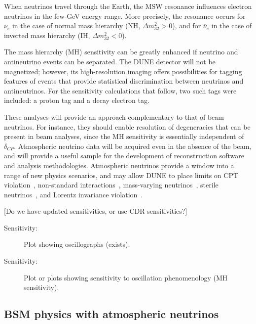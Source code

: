 When neutrinos travel through the Earth, the MSW resonance influences 
electron neutrinos in the few-GeV energy range. More precisely, the resonance 
occurs for $\nu_e$ in the case of normal mass hierarchy (NH, $\Delta m^2_{32} > 0$), and for 
$\overline{\nu}_e$ in the case of inverted mass hierarchy (IH, $\Delta m^2_{32} < 0$).

The mass hierarchy (MH) sensitivity can be greatly enhanced if neutrino and antineutrino events can be 
separated. The DUNE detector will not be magnetized; however, its high-resolution 
imaging offers possibilities for tagging features of events that provide statistical 
discrimination between neutrinos and antineutrinos. For the sensitivity calculations 
that follow, two such tags were included: a proton tag and a decay electron tag. 

These analyses will provide an approach complementary to that of beam neutrinos. 
For instance, they should enable resolution of 
degeneracies that can be present in beam analyses, since %
the MH sensitivity is essentially independent of $\delta_{CP}$.   Atmospheric neutrino data will be acquired 
even in the absence of the beam, and will provide a useful sample for the development of 
reconstruction software and analysis methodologies.  
Atmospheric neutrinos provide a window into a range of new physics scenarios, and %
may allow DUNE to place limits on CPT violation~\cite{Kostelecky:2003cr}, 
non-standard interactions~\cite{Chatterjee:2014gxa}, mass-varying neutrinos~\cite{Abe:2008zza}, 
sterile neutrinos~\cite{Abe:2014gda}, and
Lorentz invariance violation~\cite{Kostelecky:2011gq}.

[Do we have updated sensitivities, or use CDR sensitivities?]

\begin{description}
\item[Sensitivity:] Plot showing oscillographs (exists). 
\item[Sensitivity:] Plot or plots showing sensitivity to oscillation phenomenology (MH sensitivity). 
\end{description}


\subsection{BSM physics with atmospheric neutrinos}
\label{sec:nonaccel-atm-bsm}


